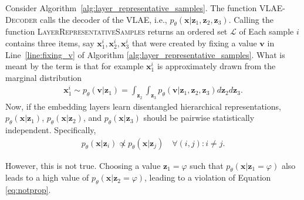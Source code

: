 Consider Algorithm~\ref{alg:layer_representative_samples}.
The function \textsc{VLAE-Decoder} calls the decoder of the VLAE, i.e., $p_\theta(\bm{x} | \bm{z}_1, \bm{z}_2, \bm{z}_3)$.
Calling the function \textsc{LayerRepresentativeSamples} returns an ordered set $\mathcal{L}$ of 
Each sample $i$ contains three items, say $\bm{x}_1^i, \bm{x}_2^i, \bm{x}_3^i$ that were created by fixing a value $\bm{v}$ in Line~\ref{line:fixing_v} of Algorithm \ref{alg:layer_representative_samples}.
What is meant by the term  is that for example $\bm{x}_1^i$ is approximately drawn from the marginal distribution
\begin{align}
    \bm{x}_1^i \sim p_\theta(\bm{v} | \bm{z}_1) = \int_{\bm{z}_2} \int_{\bm{z}_3} p_\theta(\bm{v} | \bm{z}_1, \bm{z}_2, \bm{z}_3) d\bm{z}_2 d\bm{z}_3.
\end{align}
Now, if the embedding layers learn disentangled hierarchical representations, $p_\theta(\bm{x} | \bm{z}_1)$, $p_\theta(\bm{x} | \bm{z}_2)$, and $p_\theta(\bm{x} | \bm{z}_3)$ should be pairwise statistically independent.
Specifically,
\begin{align}
    p_\theta(\bm{x} | \bm{z}_i) \not \propto p_\theta(\bm{x} | \bm{z}_j) \quad \forall (i,j):i\neq j. \label{eq:notprop}
\end{align}

However, this is not true.
Choosing a value $\bm{z}_1 = \varphi$ such that $p_\theta(\bm{x} | \bm{z}_1 = \varphi)$ also leads to a high value of $p_\theta(\bm{x} | \bm{z}_2 = \varphi)$, leading to a violation of Equation \ref{eq:notprop}.

